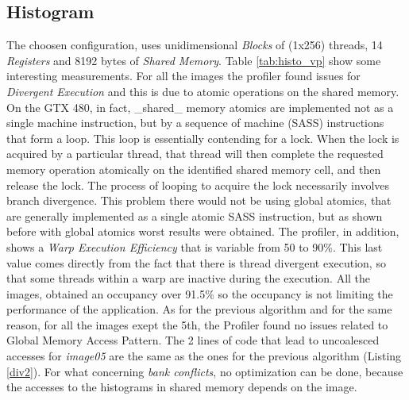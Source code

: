 \documentclass[a4paper]{article}
\begin{document}
\subsection{Histogram}
\label{sec:a2}
The choosen configuration, uses unidimensional \textit{Blocks} of (1x256) threads, 14 \textit{Registers} and 8192 bytes of \textit{Shared Memory}. Table \ref{tab:histo_vp} show some interesting measurements.
For all the images the profiler found issues for \textit{Divergent Execution} and this is due to atomic operations on the shared memory. On the GTX 480, in fact, \_shared\_ memory atomics are implemented not as a single machine instruction, but by a sequence of machine (SASS) instructions that form a loop.
This loop is essentially contending for a lock. When the lock is acquired by a particular thread, that thread will then complete the requested memory operation atomically on the identified shared memory cell, and then release the lock. The process of looping to acquire the lock necessarily involves branch divergence. This problem there would not be using global atomics, that are generally implemented as a single atomic SASS instruction, but as shown before with global atomics worst results were obtained. The profiler, in addition, shows a \textit{Warp Execution Efficiency} that is variable from 50 to 90\%.
This last value comes directly from the fact that there is thread divergent execution, so that some threads within a warp are inactive during the execution. All the images, obtained an occupancy over 91.5\% so the occupancy is not limiting the performance of the application. As for the previous algorithm and for the same reason, for all the images exept the 5th, the Profiler found no issues related to Global Memory Access Pattern. The 2 lines of code that lead to uncoalesced accesses for \textit{image05} are the same as the ones for the previous algorithm (Listing \ref{div2}). For what concerning \textit{bank conflicts}, no optimization can be done, because the accesses to the histograms in shared memory depends on the image.
 
\end{document}
